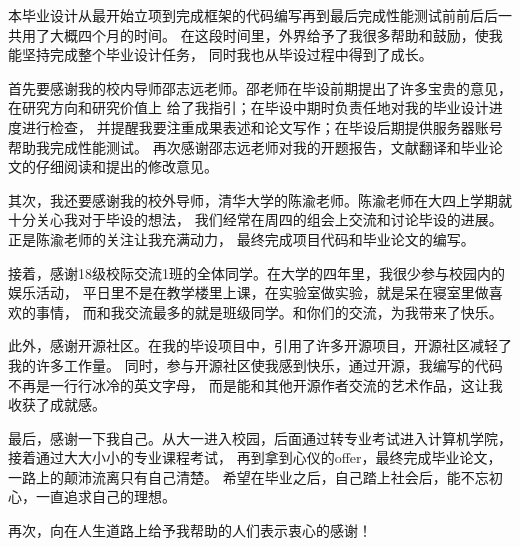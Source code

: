 \documentclass[supercite]{HustGraduPaper}
\theoremstyle{definition}
\begin{document}
\begin{thankpage}

本毕业设计从最开始立项到完成框架的代码编写再到最后完成性能测试前前后后一共用了大概四个月的时间。
在这段时间里，外界给予了我很多帮助和鼓励，使我能坚持完成整个毕业设计任务，
同时我也从毕设过程中得到了成长。\par

首先要感谢我的校内导师邵志远老师。邵老师在毕设前期提出了许多宝贵的意见，在研究方向和研究价值上
给了我指引；在毕设中期时负责任地对我的毕业设计进度进行检查，
并提醒我要注重成果表述和论文写作；在毕设后期提供服务器账号帮助我完成性能测试。
再次感谢邵志远老师对我的开题报告，文献翻译和毕业论文的仔细阅读和提出的修改意见。\par

其次，我还要感谢我的校外导师，清华大学的陈渝老师。陈渝老师在大四上学期就十分关心我对于毕设的想法，
我们经常在周四的组会上交流和讨论毕设的进展。正是陈渝老师的关注让我充满动力，
最终完成项目代码和毕业论文的编写。\par

接着，感谢18级校际交流1班的全体同学。在大学的四年里，我很少参与校园内的娱乐活动，
平日里不是在教学楼里上课，在实验室做实验，就是呆在寝室里做喜欢的事情，
而和我交流最多的就是班级同学。和你们的交流，为我带来了快乐。\par

此外，感谢开源社区。在我的毕设项目中，引用了许多开源项目，开源社区减轻了我的许多工作量。
同时，参与开源社区使我感到快乐，通过开源，我编写的代码不再是一行行冰冷的英文字母，
而是能和其他开源作者交流的艺术作品，这让我收获了成就感。\par

最后，感谢一下我自己。从大一进入校园，后面通过转专业考试进入计算机学院，
接着通过大大小小的专业课程考试，
再到拿到心仪的offer，最终完成毕业论文，一路上的颠沛流离只有自己清楚。
希望在毕业之后，自己踏上社会后，能不忘初心，一直追求自己的理想。\par

再次，向在人生道路上给予我帮助的人们表示衷心的感谢！\par

\end{thankpage}

\nocite{*}


\end{document}
